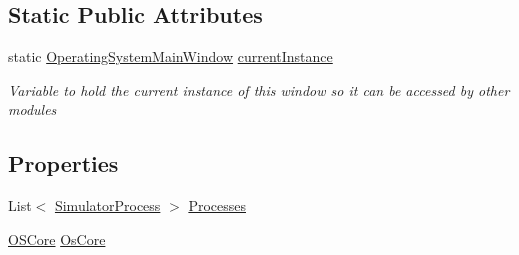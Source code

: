 \subsection*{Static Public Attributes}
\begin{DoxyCompactItemize}
\item 
static \hyperlink{class_c_p_u___o_s___simulator_1_1_operating_system_main_window}{Operating\+System\+Main\+Window} \hyperlink{class_c_p_u___o_s___simulator_1_1_operating_system_main_window_ac659b34226b30276331daba60ec7d439}{current\+Instance}
\begin{DoxyCompactList}\small\item\em Variable to hold the current instance of this window so it can be accessed by other modules \end{DoxyCompactList}\end{DoxyCompactItemize}
\subsection*{Properties}
\begin{DoxyCompactItemize}
\item 
List$<$ \hyperlink{class_c_p_u___o_s___simulator_1_1_operating___system_1_1_simulator_process}{Simulator\+Process} $>$ \hyperlink{class_c_p_u___o_s___simulator_1_1_operating_system_main_window_aadbbb1f580d767211e180a95ec71b849}{Processes}
\item 
\hyperlink{class_c_p_u___o_s___simulator_1_1_operating___system_1_1_o_s_core}{O\+S\+Core} \hyperlink{class_c_p_u___o_s___simulator_1_1_operating_system_main_window_ad714e0ed6e880516f8afc3f1531a2d14}{Os\+Core}
\end{DoxyCompactItemize}
